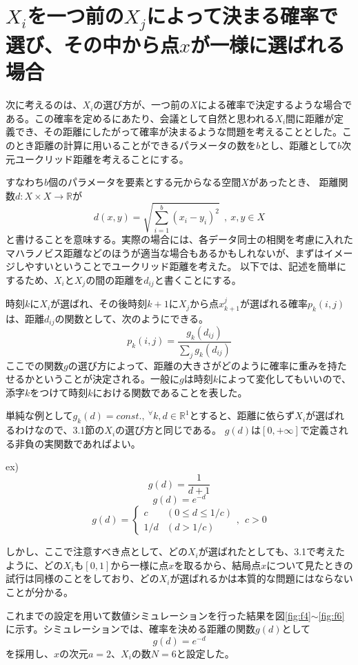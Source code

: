 \section{$X_{i}$を一つ前の$X_{j}$によって決まる確率で選び、その中から点$x$が一様に選ばれる場合}

次に考えるのは、$X_{i}$の選び方が、一つ前の$X$による確率で決定するような場合である。この確率を定めるにあたり、会議として自然と思われる$X_{i}$間に距離が定義でき、その距離にしたがって確率が決まるような問題を考えることとした。このとき距離の計算に用いることができるパラメータの数を$b$とし、距離として$b$次元ユークリッド距離を考えることにする。

すなわち$b$個のパラメータを要素とする元からなる空間$X$があったとき、
距離関数$d: X \times X \rightarrow \mathbb{R}$が
\[d(x, y) = \sqrt{\sum_{i=1}^{b}(x_{i}-y_{i})^{2}}\ \ ,\ x,y\in X\]
と書けることを意味する。実際の場合には、各データ同士の相関を考慮に入れたマハラノビス距離などのほうが適当な場合もあるかもしれないが、まずはイメージしやすいということでユークリッド距離を考えた。
以下では、記述を簡単にするため、$X_{i}$と$X_{j}$の間の距離を$d_{ij}$と書くことにする。

時刻$k$に$X_{i}$が選ばれ、その後時刻$k+1$に$X_{j}$から点$x_{k+1}^{j}$が選ばれる確率$p_{k}(i,j)$は、距離$d_{ij}$の関数として、次のようにできる。
\[p_{k}(i,j) = \frac{g_{k}(d_{ij})}{\sum_{j} g_{k}(d_{ij})}\]
ここでの関数$g$の選び方によって、距離の大きさがどのように確率に重みを持たせるかということが決定される。一般に$g$は時刻$k$によって変化してもいいので、添字$k$をつけて時刻$k$における関数であることを表した。

単純な例として$g_{k}(d) = const.,\ ^{\forall}k, d\in \mathbb{R}^{1}$とすると、距離に依らず$X_{i}$が選ばれるわけなので、3.1節の$X_{i}$の選び方と同じである。
$g(d)$は$[0, +\infty]$で定義される非負の実関数であればよい。

ex)
\[g(d) = \frac{1}{d+1}\]
\[g(d) = e^{-d}\]
\[g(d) = \left\{ \begin{array}{ll} c & (0\le d \le 1/c) \nonumber\\
1/d & (d>1/c)\end{array}\right., \ \ c>0\]

しかし、ここで注意すべき点として、どの$X_{i}$が選ばれたとしても、3.1で考えたように、どの$X_{i}$も$[0,1]$から一様に点$x$を取るから、結局点$x$について見たときの試行は同様のことをしており、どの$X_{i}$が選ばれるかは本質的な問題にはならないことが分かる。

これまでの設定を用いて数値シミュレーションを行った結果を図\ref{fig:f4}$\sim$\ref{fig:f6}に示す。シミュレーションでは、確率を決める距離の関数$g(d)$として
\[g(d) = e^{-d}\]
を採用し、$x$の次元$a=2$、$X_{i}$の数$N=6$と設定した。

